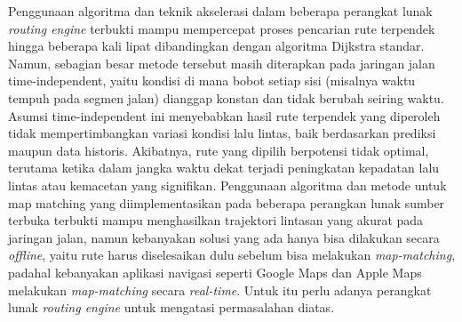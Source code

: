 Penggunaan algoritma dan teknik akselerasi dalam beberapa perangkat lunak \textit{routing engine} terbukti mampu mempercepat proses pencarian rute terpendek hingga beberapa kali lipat dibandingkan dengan algoritma Dijkstra standar. Namun, sebagian besar metode tersebut masih diterapkan pada jaringan jalan time-independent, yaitu kondisi di mana bobot setiap sisi (misalnya waktu tempuh pada segmen jalan) dianggap konstan dan tidak berubah seiring waktu. Asumsi time-independent ini menyebabkan hasil rute terpendek yang diperoleh tidak mempertimbangkan variasi kondisi lalu lintas, baik berdasarkan prediksi maupun data historis. Akibatnya, rute yang dipilih berpotensi tidak optimal, terutama ketika dalam jangka waktu dekat terjadi peningkatan kepadatan lalu lintas atau kemacetan yang signifikan. Penggunaan algoritma dan metode untuk map matching yang diimplementasikan pada beberapa perangkan lunak sumber terbuka terbukti mampu menghasilkan trajektori lintasan yang akurat pada jaringan jalan, namun kebanyakan solusi yang ada hanya bisa dilakukan secara \textit{offline}, yaitu rute harus diselesaikan dulu sebelum bisa melakukan \textit{map-matching}, padahal kebanyakan aplikasi navigasi seperti Google Maps dan Apple Maps melakukan \textit{map-matching} secara \textit{real-time}. Untuk itu perlu adanya perangkat lunak \textit{routing engine} untuk mengatasi permasalahan diatas.

